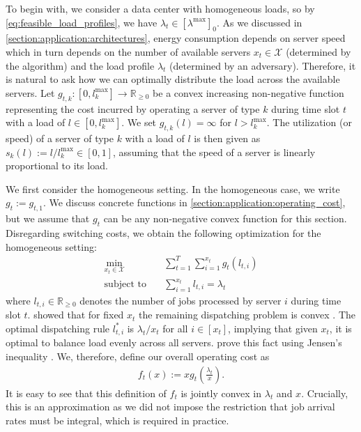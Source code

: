 To begin with, we consider a data center with homogeneous loads, so by \autoref{eq:feasible_load_profiles}, we have $\lambda_t \in [\lambda^{\text{max}}]_0$. As we discussed in \autoref{section:application:architectures}, energy consumption depends on server speed which in turn depends on the number of available servers $x_t \in \mathcal{X}$ (determined by the algorithm) and the load profile $\lambda_t$ (determined by an adversary). Therefore, it is natural to ask how we can optimally distribute the load across the available servers. Let $g_{t,k} : [0,l_k^{\text{max}}] \to \mathbb{R}_{\geq 0}$ be a convex increasing non-negative function representing the cost incurred by operating a server of type $k$ during time slot $t$ with a load of $l \in [0,l_k^{\text{max}}]$. We set $g_{t,k}(l) = \infty$ for $l > l_k^{\text{max}}$. The utilization (or speed) of a server of type $k$ with a load of $l$ is then given as $s_k(l) := l / l_k^{\text{max}} \in [0,1]$, assuming that the speed of a server is linearly proportional to its load.

We first consider the homogeneous setting. In the homogeneous case, we write $g_t := g_{t,1}$. We discuss concrete functions in \autoref{section:application:operating_cost}, but we assume that $g_t$ can be any non-negative convex function for this section. Disregarding switching costs, we obtain the following optimization for the homogeneous setting: \begin{align*}
    \min_{x_t \in \mathcal{X}} \quad &\sum_{t=1}^T \sum_{i=1}^{x_t} g_t(l_{t,i}) \\
    \text{subject to}        \quad &\sum_{i=1}^{x_t} l_{t,i} = \lambda_t
\end{align*} where $l_{t,i} \in \mathbb{R}_{\geq 0}$ denotes the number of jobs processed by server $i$ during time slot $t$. \citeauthor*{Lin2011} showed that for fixed $x_t$ the remaining dispatching problem is convex \cite{Lin2011}. The optimal dispatching rule $l_{t,i}^*$ is $\lambda_t / x_t$ for all $i \in [x_t]$, implying that given $x_t$, it is optimal to balance load evenly across all servers. \citeauthor*{Albers2021_2} prove this fact using Jensen's inequality \cite{Albers2021_2}. We, therefore, define our overall operating cost as \begin{align}\label{eq:homogeneous_load_balancing}
    f_t(x) := x g_t\left(\frac{\lambda_t}{x}\right).
\end{align} It is easy to see that this definition of $f_t$ is jointly convex in $\lambda_t$ and $x$. Crucially, this is an approximation as we did not impose the restriction that job arrival rates must be integral, which is required in practice.

